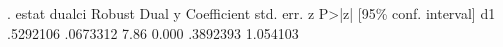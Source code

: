 . estat dualci
{\smallskip}
             {\VBAR}               Robust                               Dual
           y {\VBAR} Coefficient  std. err.      z    P>|z|     [95\% conf. interval]
          d1 {\VBAR}   .5292106   .0673312     7.86   0.000     .3892393    1.054103
